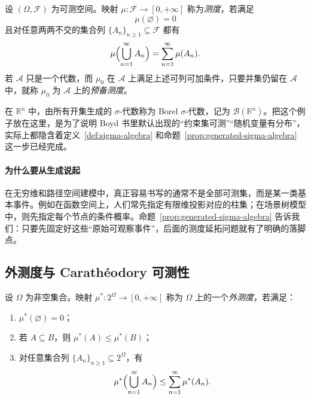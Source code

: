 \begin{definition}[测度与预备测度]\label{def:measure-premeasure}
设 $(\Omega,\mathscr F)$ 为可测空间。映射 $\mu\colon \mathscr F\to [0,+\infty]$ 称为\emph{测度}，若满足
\[
\mu(\varnothing)=0
\]
且对任意两两不交的集合列 $\{A_n\}_{n\ge1}\subseteq \mathscr F$ 都有
\[
\mu\Bigl(\bigcup_{n=1}^{\infty}A_n\Bigr)=\sum_{n=1}^{\infty}\mu(A_n).
\]
若 $\mathscr A$ 只是一个代数，而 $\mu_0$ 在 $\mathscr A$ 上满足上述可列可加条件，只要并集仍留在 $\mathscr A$ 中，就称 $\mu_0$ 为 $\mathscr A$ 上的\emph{预备测度}。
\end{definition}

\begin{example}\label{ex:borel-sigma-rn}
在 $\mathbb R^n$ 中，由所有开集生成的 $\sigma$-代数称为 Borel $\sigma$-代数，记为 $\mathcal B(\mathbb R^n)$。把这个例子放在这里，是为了说明 Boyd 书里默认出现的“约束集可测”“随机变量有分布”，实际上都隐含着定义~\ref{def:sigma-algebra} 和命题~\ref{prop:generated-sigma-algebra} 这一步已经完成。
\end{example}

\paragraph{为什么要从生成说起}

\begin{remark}
在无穷维和路径空间建模中，真正容易书写的通常不是全部可测集，而是某一类基本事件。例如在函数空间上，人们常先指定有限维投影对应的柱集；在场景树模型中，则先指定每个节点的条件概率。命题~\ref{prop:generated-sigma-algebra} 告诉我们：只要先固定好这些“原始可观察事件”，后面的测度延拓问题就有了明确的落脚点。
\end{remark}

\subsection{外测度与 Carathéodory 可测性}

\begin{definition}[外测度]\label{def:outer-measure}
设 $\Omega$ 为非空集合。映射 $\mu^\ast\colon 2^\Omega\to [0,+\infty]$ 称为 $\Omega$ 上的一个\emph{外测度}，若满足：
\begin{enumerate}
  \item $\mu^\ast(\varnothing)=0$；
  \item 若 $A\subseteq B$，则 $\mu^\ast(A)\le \mu^\ast(B)$；
  \item 对任意集合列 $\{A_n\}_{n\ge1}\subseteq 2^\Omega$，有
  \[
  \mu^\ast\Bigl(\bigcup_{n=1}^{\infty}A_n\Bigr)\le \sum_{n=1}^{\infty}\mu^\ast(A_n).
  \]
\end{enumerate}
\end{definition}

